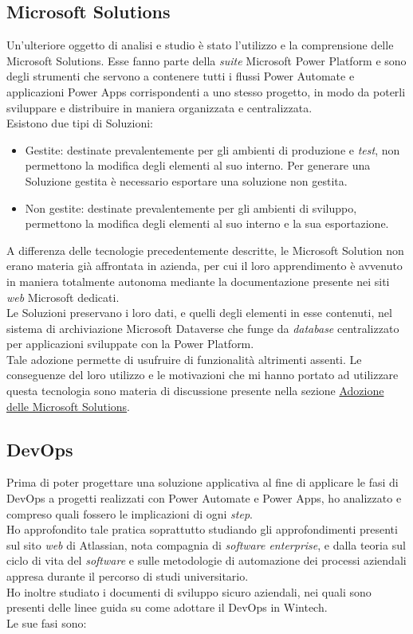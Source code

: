\newpage \subsection{Microsoft Solutions}
Un'ulteriore oggetto di analisi e studio è stato l'utilizzo e la comprensione delle Microsoft Solutions. Esse fanno parte della \emph{suite} Microsoft Power Platform e sono degli strumenti che servono a contenere tutti i flussi Power Automate e applicazioni Power Apps corrispondenti a uno stesso progetto, in modo da poterli sviluppare e distribuire in maniera organizzata e centralizzata.\\
Esistono due tipi di Soluzioni: 
\begin{itemize}
    \item Gestite: destinate prevalentemente per gli ambienti di produzione e \emph{test}, non permettono la modifica degli elementi al suo interno. Per generare una Soluzione gestita è necessario esportare una soluzione non gestita.
    \item Non gestite: destinate prevalentemente per gli ambienti di sviluppo, permettono la modifica degli elementi al suo interno e la sua esportazione.
\end{itemize}
A differenza delle tecnologie precedentemente descritte, le Microsoft Solution non erano materia già affrontata in azienda, per cui il loro apprendimento è avvenuto in maniera totalmente autonoma mediante la documentazione presente nei siti \emph{web} Microsoft dedicati.\\
Le Soluzioni preservano i loro dati, e quelli degli elementi in esse contenuti, nel sistema di archiviazione Microsoft Dataverse che funge da \emph{database} centralizzato per applicazioni sviluppate con la Power Platform.\\
Tale adozione permette di usufruire di funzionalità altrimenti assenti.
Le conseguenze del loro utilizzo e le motivazioni che mi hanno portato ad utilizzare questa tecnologia sono materia di discussione presente nella sezione \hyperref[progettazioneSolutions]{Adozione delle Microsoft Solutions}.\\

\subsection{DevOps}
Prima di poter progettare una soluzione applicativa al fine di applicare le fasi di \gls{DevOps} a progetti realizzati con Power Automate e Power Apps, ho analizzato e compreso quali fossero le implicazioni di ogni \emph{step}.\\
Ho approfondito tale pratica soprattutto studiando gli approfondimenti presenti sul sito \emph{web} di Atlassian, nota compagnia di \emph{software enterprise}, e dalla teoria sul ciclo di vita del \emph{software} e sulle metodologie di automazione dei processi aziendali appresa durante il percorso di studi universitario.\\
Ho inoltre studiato i documenti di sviluppo sicuro aziendali, nei quali sono presenti delle linee guida su come adottare il \gls{DevOps} in Wintech.\\
Le sue fasi sono:
